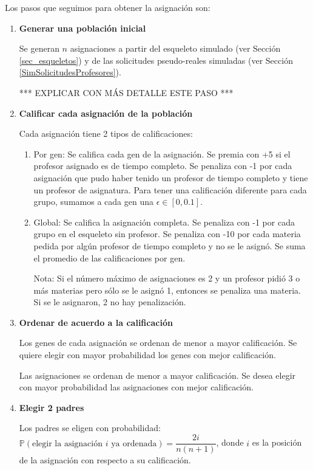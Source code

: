 Los pasos que seguimos para obtener la asignación son:

\begin{enumerate}
\item \textbf{Generar una población inicial}

Se generan $n$ asignaciones a partir del esqueleto simulado (ver Sección \ref{sec_esqueletos}) y de las solicitudes pseudo-reales simuladas (ver Sección \ref{SimSolicitudesProfesores}).

*** EXPLICAR CON MÁS DETALLE ESTE PASO ***

\item \textbf{Calificar cada asignación de la población}

Cada asignación tiene 2 tipos de calificaciones:

\begin{enumerate}
\item Por gen: Se califica cada gen de la asignación. Se premia con +5 si el profesor asignado es de tiempo completo. Se penaliza con -1 por cada asignación que pudo haber tenido un profesor de tiempo completo y tiene un profesor de asignatura. Para tener una calificación diferente para cada grupo, sumamos a cada gen una $\epsilon \in [0,0.1]$.

\item Global: Se califica la asignación completa. Se penaliza con -1 por cada grupo en el esqueleto sin profesor. Se penaliza con -10 por cada materia pedida por algún profesor de tiempo completo y no se le asignó. Se suma el promedio de las calificaciones por gen.

Nota:
Si el número máximo de asignaciones es 2 y un profesor pidió 3 o más  materias pero sólo se le asignó 1, entonces se penaliza una materia. Si se le asignaron, 2 no hay penalización.
\end{enumerate}

\item \textbf{Ordenar de acuerdo a la calificación}

Los genes de cada asignación se ordenan de menor a mayor calificación. Se quiere elegir con mayor probabilidad los genes con mejor calificación.

Las asignaciones se ordenan de menor a mayor calificación. Se desea elegir con mayor probabilidad las asignaciones con mejor calificación.

\item \textbf{Elegir 2 padres}

Los padres se eligen con probabilidad: $\mathbb{P}(\text{elegir la asignación } i \text{ ya ordenada}) = \dfrac{2i}{n(n+1)}$, donde $i$ es la posición de la asignación con respecto a su calificación.


\end{enumerate}
